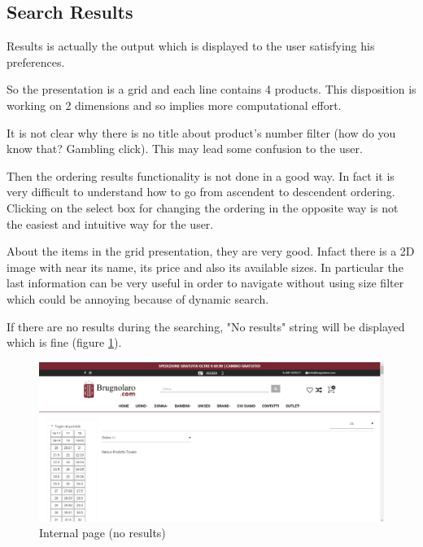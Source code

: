 \subsection{Search Results}
Results is actually the output which is displayed to the user satisfying his preferences.

So the presentation is a grid and each line contains 4 products. This disposition is working
on 2 dimensions and so implies more computational effort.

It is not clear why there is no title about product's number filter
(how do you know that? Gambling click). This may lead some confusion to the user.

Then the ordering results functionality is not done in a good way. In fact it is
very difficult to understand how to go from ascendent to descendent ordering.
Clicking on the select box for changing the ordering in the opposite way is not
the easiest and intuitive way for the user.

About the items in the grid presentation, they are very good. Infact there is a 2D image with near its name, its price
and also its available sizes. In particular the last information can be very useful in order to navigate without
using size filter which could be annoying because of dynamic search.

If there are no results during the searching, "No results" string will be displayed which is fine
(figure \ref{internal-no-results}).
\vspace*{\fill}
\begin{figure}[!h] 
    \centering 
    \includegraphics[scale = 0.29]{images/no_results.png} 
    \caption{Internal page (no results)}
    \label{internal-no-results}
\end{figure}
\vspace*{\fill}
\newpage
